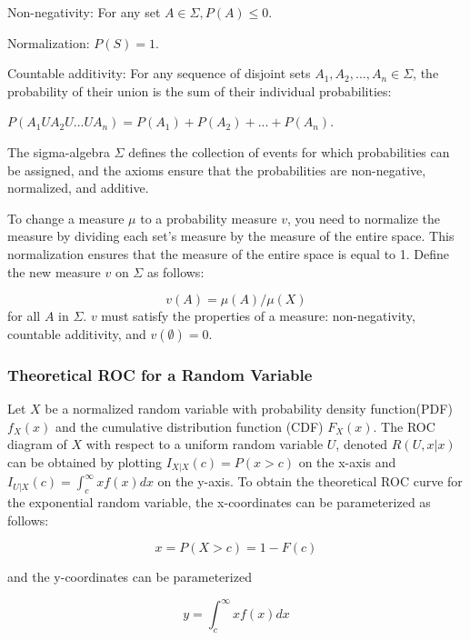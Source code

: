 \documentclass[12pt]{article} %
\theoremstyle{plain}
\begin{document}
Non-negativity: For any set $A \in \Sigma, P(A) \leq 0$.

Normalization: $P(S) = 1$.

Countable additivity: For any sequence of disjoint sets $A_1, A_2, ..., A_n \in \Sigma$, the probability of their union is the sum of their individual probabilities:

$P(A_1 U A_2 U ... U A_n) = P(A_1) + P(A_2) + ... + P(A_n)$.

The sigma-algebra $\Sigma$ defines the collection of events for which probabilities can be assigned, and the axioms ensure that the probabilities are non-negative, normalized, and additive.

To change a measure $\mu$ to a probability measure $v$, you need to normalize the measure by dividing each set's measure by the measure of the entire space. This normalization ensures that the measure of the entire space is equal to 1. Define the new measure $v$ on $\Sigma$ as follows: 

\begin{equation}
	v(A) = \mu(A) / \mu(X)
\end{equation}
\noindent for all $A$ in $\Sigma$. $v$ must satisfy the properties of a measure: non-negativity, countable additivity, and $v(\emptyset) = 0$.

\subsubsection{Theoretical ROC for a Random Variable}

Let $X$ be a normalized random variable with probability density function(PDF) $f_X(x)$
and the cumulative distribution function (CDF) $F_X(x)$. The ROC diagram of $X$ with respect to a uniform random variable $U$, denoted $R(U,x|x)$ can be obtained by plotting $I_{X|X}(c)= P(x > c)$ on the x-axis and $I_{U|X}(c)=\int_{c}^{\infty} x f(x)dx$ on the y-axis. To obtain the theoretical ROC curve for the exponential random variable, the x-coordinates can be parameterized as follows:

\begin{equation} \label{eq:xcoord}
	x=P(X>c)=1-F(c)
\end{equation}

and the y-coordinates can be parameterized 

\begin{equation} \label{eq:ycoord}
	y= \int_{c}^{\infty} x f(x)dx
\end{equation}
\end{document}
